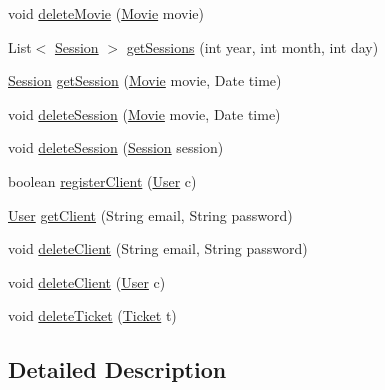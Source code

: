 \begin{DoxyCompactItemize}
void \mbox{\hyperlink{classes_1_1deusto_1_1server_1_1jdo_1_1_d_a_o_a479ca9a8597aada4e74445699140e0fd}{delete\+Movie}} (\mbox{\hyperlink{classes_1_1deusto_1_1server_1_1jdo_1_1_movie}{Movie}} movie)
\item 
List$<$ \mbox{\hyperlink{classes_1_1deusto_1_1server_1_1jdo_1_1_session}{Session}} $>$ \mbox{\hyperlink{classes_1_1deusto_1_1server_1_1jdo_1_1_d_a_o_a2f9f9eb5adc37f559d7fefe2da6544f1}{get\+Sessions}} (int year, int month, int day)
\item 
\mbox{\hyperlink{classes_1_1deusto_1_1server_1_1jdo_1_1_session}{Session}} \mbox{\hyperlink{classes_1_1deusto_1_1server_1_1jdo_1_1_d_a_o_a34f9e5400280bbc1a9fce9143696470e}{get\+Session}} (\mbox{\hyperlink{classes_1_1deusto_1_1server_1_1jdo_1_1_movie}{Movie}} movie, Date time)
\item 
void \mbox{\hyperlink{classes_1_1deusto_1_1server_1_1jdo_1_1_d_a_o_a399605bc2a2fd86679ddf7793b71de12}{delete\+Session}} (\mbox{\hyperlink{classes_1_1deusto_1_1server_1_1jdo_1_1_movie}{Movie}} movie, Date time)
\item 
void \mbox{\hyperlink{classes_1_1deusto_1_1server_1_1jdo_1_1_d_a_o_aa4010f98d33fbdb583bb361ab576ff2d}{delete\+Session}} (\mbox{\hyperlink{classes_1_1deusto_1_1server_1_1jdo_1_1_session}{Session}} session)
\item 
boolean \mbox{\hyperlink{classes_1_1deusto_1_1server_1_1jdo_1_1_d_a_o_a783758c37658336ee1e4e995a672a0ce}{register\+Client}} (\mbox{\hyperlink{classes_1_1deusto_1_1server_1_1jdo_1_1_user}{User}} c)
\item 
\mbox{\hyperlink{classes_1_1deusto_1_1server_1_1jdo_1_1_user}{User}} \mbox{\hyperlink{classes_1_1deusto_1_1server_1_1jdo_1_1_d_a_o_a340f51843de8957e9ef8b0c95081512a}{get\+Client}} (String email, String password)
\item 
void \mbox{\hyperlink{classes_1_1deusto_1_1server_1_1jdo_1_1_d_a_o_a9664ce68819a53c7b27add7f305a52b0}{delete\+Client}} (String email, String password)
\item 
void \mbox{\hyperlink{classes_1_1deusto_1_1server_1_1jdo_1_1_d_a_o_aa914bb9b49e39cfa9a1254ce578aaae1}{delete\+Client}} (\mbox{\hyperlink{classes_1_1deusto_1_1server_1_1jdo_1_1_user}{User}} c)
\item 
void \mbox{\hyperlink{classes_1_1deusto_1_1server_1_1jdo_1_1_d_a_o_a174a90986e95dcae4ab728c8d1a16ca8}{delete\+Ticket}} (\mbox{\hyperlink{classes_1_1deusto_1_1server_1_1jdo_1_1_ticket}{Ticket}} t)
\end{DoxyCompactItemize}


\subsection{Detailed Description}


